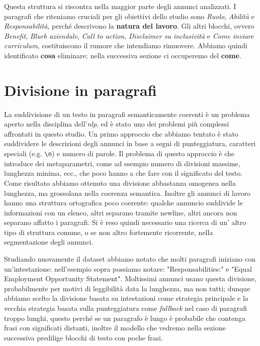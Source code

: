 Questa struttura si riscontra nella maggior parte degli annunci analizzati. I paragrafi che riteniamo cruciali per gli obiettivi dello studio sono \textit{Ruolo}, \textit{Abilità} e \textit{Responsabilità}, perché descrivono la \textbf{natura del lavoro}. Gli altri blocchi, ovvero \textit{Benefit}, \textit{Blurb aziendale}, \textit{Call to action}, \textit{Disclaimer su inclusività} e \textit{Come inviare curriculum}, costituiscono il rumore che intendiamo rimuovere. Abbiamo quindi identificato \textbf{cosa} eliminare; nella successiva sezione ci occuperemo del \textbf{come}.

\section{Divisione in paragrafi}

\noindent La suddivisione di un testo in paragrafi semanticamente coerenti è un problema aperto nella disciplina dell'\textit{nlp}, ed è stato uno dei problemi più complessi affrontati in questo studio. Un primo approccio che abbiamo tentato è stato suddividere le descrizioni degli annunci in base a segni di punteggiatura, caratteri speciali (e.g. \texttt{\textbackslash n}) e numero di parole. Il problema di questo approccio è che introduce dei metaparametri, come ad esempio numero di divisioni massime, lunghezza minima, ecc., che poco hanno a che fare con il significato del testo. Come risultato abbiamo ottenuto una divisione abbastanza omogenea nella lunghezza, ma grossolana nella coerenza semantica. Inoltre gli annunci di lavoro hanno una struttura ortografica poco coerente: qualche annuncio suddivide le informazioni con un elenco, altri separano tramite newline, altri ancora non separano affatto i paragrafi. Si è reso quindi necessario una ricerca di un' altro tipo di struttura comune, o se non altro fortemente ricorrente, nella segmentazione degli annunci.

\medskip

\noindent Studiando nuovamente il dataset abbiamo notato che molti paragrafi iniziano con un'intestazione: nell'esempio sopra possiamo notare: "Responsabilities:" e "Equal Employment Opportunity Statement". Moltissimi annunci usano questa divisione, probabilmente  per motivi di leggibilità data la lunghezza, ma non tutti; dunque abbiamo scelto la divisione basata su intestazioni come strategia principale e la vecchia strategia basata sulla punteggiatura come \textit{fallback} nel caso di paragrafi troppo lunghi, questo perché se un paragrafo è lungo è probabile che contenga frasi con significati distanti, inoltre il modello che vedremo nella sezione successiva predilige blocchi di testo con poche frasi.

